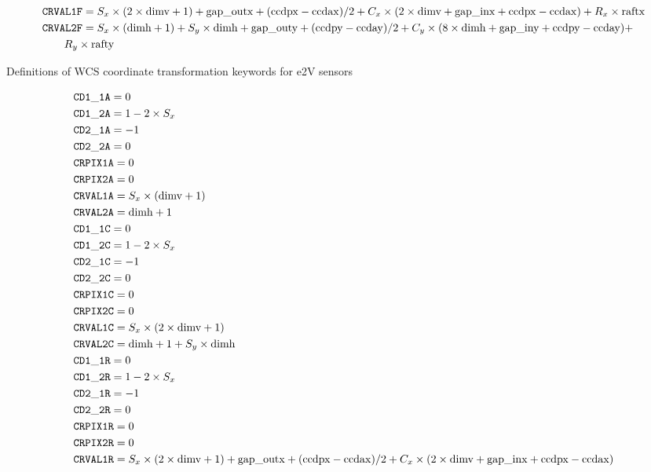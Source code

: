\documentclass{article}[12pt]
\begin{document}
\begin{table}
\begin{align*}
& {\tt CRVAL1F} = S_x \times (2 \times {\rm dimv} + 1) + {\rm gap\_outx} + ({\rm ccdpx} - {\rm ccdax})/2 +  C_x \times (2 \times {\rm dimv} + {\rm gap\_inx} + {\rm ccdpx} - {\rm ccdax}) +R_x \times {\rm raftx} \\
& {\tt CRVAL2F} = S_x \times ({\rm dimh} + 1) + S_y \times {\rm dimh} +  {\rm gap\_outy} + ({\rm ccdpy} -  {\rm ccday})/2 + C_y \times ( 8 \times {\rm dimh} + {\rm gap\_iny} + {\rm ccdpy} - {\rm ccday}) + \\  &\qquad {} R_y \times {\rm rafty}  \\
\end{align*}
\caption{Definitions of WCS coordinate transformation keywords for e2V sensors\label{tab:e2vwcs}}
\end{table}

\begin{table}
\begin{align*}
& {\tt CD1\_1A} = 0 \\
& {\tt CD1\_2A} = 1 - 2 \times S_x \\
& {\tt CD2\_1A} = -1 \\
& {\tt CD2\_2A} = 0 \\
& {\tt CRPIX1A} = 0 \\
& {\tt CRPIX2A} = 0 \\
& {\tt CRVAL1A} = S_x \times({\rm dimv} + 1) \\
& {\tt CRVAL2A} = {\rm dimh} + 1 \\
& {\tt CD1\_1C} = 0 \\
& {\tt CD1\_2C} = 1 - 2 \times S_x \\
& {\tt CD2\_1C} = -1 \\
& {\tt CD2\_2C} = 0 \\
& {\tt CRPIX1C} = 0 \\
& {\tt CRPIX2C} = 0 \\
& {\tt CRVAL1C} = S_x \times(2 \times {\rm dimv} + 1) \\
& {\tt CRVAL2C} = {\rm dimh} + 1 + S_y \times {\rm dimh} \\
& {\tt CD1\_1R} = 0 \\
& {\tt CD1\_2R} = 1 - 2 \times S_x \\
& {\tt CD2\_1R} = -1 \\
& {\tt CD2\_2R} = 0 \\
& {\tt CRPIX1R} = 0 \\
& {\tt CRPIX2R} = 0 \\
& {\tt CRVAL1R} = S_x \times(2 \times {\rm dimv} + 1) + {\rm gap\_outx} + ({\rm ccdpx} - {\rm ccdax})/2 + C_x \times (2 \times {\rm dimv} + {\rm gap\_inx} + {\rm ccdpx} - {\rm ccdax}) \\

\end{align*}
\end{table}
\end{document}
